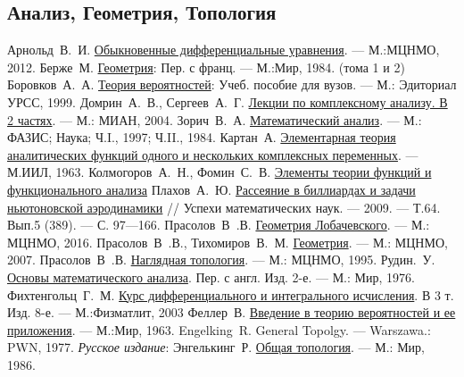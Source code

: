 \documentclass[11pt]{book}
\theoremstyle{mythm}
\theoremstyle{mydef}
\numberwithin{upr}{chapter}
\begin{document}
\begin{thebibliography}{199}
\subsection*{Анализ, Геометрия, Топология}

 Арнольд~В.~И. \href{https://mccme.ru/arnold/books/odu-12.pdf}{Обыкновенные дифференциальные уравнения}. --- М.:МЦНМО, 2012.
 Берже~М. \href{https://obuchalka.org/2013062272057/geometriya-tom-1-berje-m-1984.html}{Геометрия}: Пер. с франц. --- М.:Мир, 1984. (тома 1 и 2)
 Боровков~А.~А. \href{https://vk.com/doc126754362_437580661?hash=bf4881377ccffd3181&dl=e2a6fd73b6ca9524a6}{Теория вероятностей}: Учеб. пособие для вузов. --- М.: Эдиториал УРСС, 1999.
 Домрин~А.~В., Сергеев~А.~Г. \href{http://www.mi-ras.ru/books/pdf/ser1.pdf}{Лекции по комплексному анализу. В 2 частях}. --- М.: МИАН, 2004.
 Зорич~В.~А. \href{https://may.alleng.org/d/math/math460.htm}{Математический анализ}. --- М.: ФАЗИС; Наука; Ч.I., 1997; Ч.II., 1984.
 Картан~А. \href{https://ikfia.ysn.ru/wp-content/uploads/2018/01/Kartan1963ru.pdf}{Элементарная теория аналитических функций одного и нескольких комплексных переменных}. --- М.ИИЛ, 1963.
 Колмогоров~А.~Н., Фомин~С.~В. \href{https://b-ok.cc/book/443504/108801}{Элементы теории функций и функционального анализа}
 Плахов~А.~Ю. \href{http://www.etudes.ru/data/localdocs/umn_plahov.pdf}{Рассеяние в биллиардах и задачи ньютоновской аэродинамики} // Успехи математических наук. --- 2009. --- Т.64. Вып.5 (389). --- С. 97—166.
 Прасолов~В~.В. \href{https://yadi.sk/d/teZTJ7wC7L4r2}{Геометрия Лобачевского}. --- М.: МЦНМО, 2016.
 Прасолов~В~.В., Тихомиров~В.~М. \href{http://prasolov.loegria.net/Geometry.pdf}{Геометрия}. --- М.: МЦНМО, 2007.
 Прасолов~В~.В. \href{ftp://ftp.mccme.ru/users/prasolov/nagltop/pra.pdf}{Наглядная топология}. --- М.: МЦНМО, 1995.
 Рудин.~У. \href{https://may.alleng.org/d/math/math344.htm}{Основы математического анализа}. Пер. с англ. Изд. 2-е. --- М.: Мир, 1976.
 Фихтенгольц~Г.~М. \href{https://obuchalka.org/201012217156/kurs-differencialnogo-i-integralnogo-ischisleniya-fihtengolc-g-m.html}{Курс дифференциального и интегрального исчисления}. В 3 т. Изд. 8-е. --- М.:Физматлит, 2003
 Феллер~В. \href{https://obuchalka.org/2013071272400/vvedenie-v-teoriu-veroyatnostei-i-ee-prilojeniya-tom-1-feller-v-1963.html}{Введение в теорию вероятностей и ее приложения}. --- М.:Мир, 1963.
 Engelking~R. General Topolgy. --- Warszawa.: PWN, 1977. \textit{Русское издание}: Энгелькинг~Р. \href{https://www.studmed.ru/engelking-r-obschaya-topologiya_14e4d9ddf48.html}{Общая топология}. --- М.: Мир, 1986.

\end{thebibliography}
\end{document}
